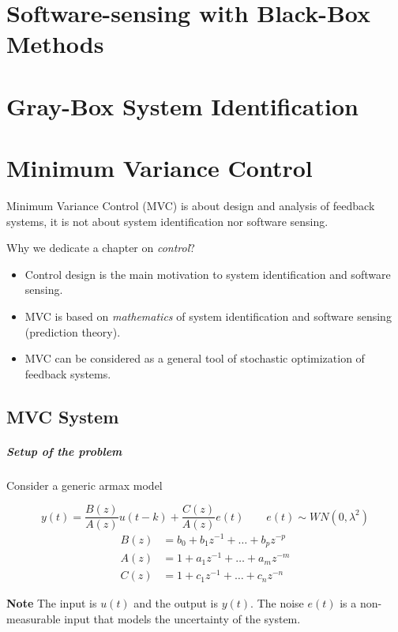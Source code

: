 
\chapter{Software-sensing with Black-Box Methods}


\chapter{Gray-Box System Identification}\label{ch5}


\chapter{Minimum Variance Control}
Minimum Variance Control (MVC) is about design and analysis of feedback systems, it is not about system identification nor software sensing.

Why we dedicate a chapter on \emph{control}?
\begin{itemize}
    \item Control design is the main motivation to system identification and software sensing.
    \item MVC is based on \emph{mathematics} of system identification and software sensing (prediction theory).
    \item MVC can be considered as a general tool of stochastic optimization of feedback systems.
\end{itemize}

\section{MVC System}

\paragraph{Setup of the problem} Consider a generic \gls{armax} model

\begin{rem}
	\[
	    y(t) = \frac{B(z)}{A(z)}u(t-k) + \frac{C(z)}{A(z)}e(t) \qquad e(t) \sim WN(0, \lambda^2)
	\]
	\begin{align*}
	    B(z) &= b_0 + b_1z^{-1} + \dots + b_pz^{-p} \\
	    A(z) &= 1   + a_1z^{-1} + \dots + a_mz^{-m} \\
	    C(z) &= 1   + c_1z^{-1} + \dots + c_nz^{-n}
	\end{align*}

	\textbf{Note} The input is $u(t)$ and the output is $y(t)$. The noise $e(t)$ is a non-measurable input that models the uncertainty of the system.  
\end{rem}

